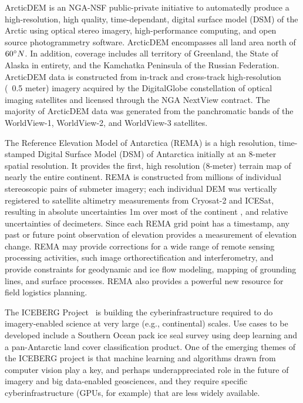 \documentclass[10pt,letterpaper,draft]{article}
\begin{document}
\begin{description}[style=unboxed]
	
	\item [ArcticDEM:] ArcticDEM is an NGA-NSF public-private initiative to automatedly produce a high-resolution, high quality, time-dependant, digital surface model (DSM) of the Arctic using optical stereo imagery, high-performance computing, and open source photogrammetry software. ArcticDEM encompasses all land area north of $60\degree N$. In addition, coverage includes all territory of Greenland, the State of Alaska in entirety, and the Kamchatka Peninsula of the Russian Federation. ArcticDEM data is constructed from in-track and cross-track high-resolution (~0.5 meter) imagery acquired by the DigitalGlobe constellation of optical imaging satellites and licensed through the NGA NextView contract. The majority of ArcticDEM data was generated from the panchromatic bands of the WorldView-1, WorldView-2, and WorldView-3 satellites. 
  
	\item [REMA:] The Reference Elevation Model of Antarctica (REMA) is a high resolution, time-stamped Digital Surface Model (DSM) of Antarctica initially at an 8-meter spatial resolution. It provides the first, high resolution (8-meter) terrain map of nearly the entire continent. REMA is constructed from millions of individual stereoscopic pairs of submeter imagery; each individual DEM was vertically registered to satellite altimetry measurements from Cryosat-2 and ICESat, resulting in absolute uncertainties   1m over most of the continent , and relative uncertainties of decimeters. Since each REMA grid point has a timestamp, any past or future point observation of elevation provides a measurement of elevation change. REMA may provide corrections for a wide range of remote sensing processing activities, such image orthorectification and interferometry, and provide constraints for geodynamic and ice flow modeling, mapping of grounding lines, and surface processes. REMA also provides a powerful new resource for field logistics planning.

	\item [ICEBERG: Imagery CI and Extensible Building-Blocks to Enhance Research in the Geosciences:] The ICEBERG Project~\cite{Hackathon} is building the cyberinfrastructure required to do imagery-enabled science at very large (e.g., continental) scales. Use cases to be developed include a Southern Ocean pack ice seal survey using deep learning and a pan-Antarctic land cover classification product. One of the emerging themes of the ICEBERG project is that machine learning and algorithms drawn from computer vision play a key, and perhaps underappreciated role in the future of imagery and big data-enabled geosciences, and they require specific cyberinfrastructure (GPUs, for example) that are less widely available.


\end{description}
\end{document}
